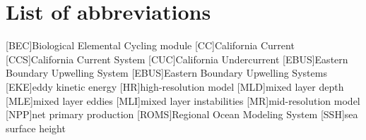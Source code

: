 \chapter*{List of abbreviations}
%
\begin{acronym}
[BEC]{Biological Elemental Cycling module}
[CC]{California Current}
[CCS]{California Current System}
[CUC]{California Undercurrent}
[EBUS]{Eastern Boundary Upwelling System}
[EBUS]{Eastern Boundary Upwelling Systems}
[EKE]{eddy kinetic energy}
[HR]{high-resolution model}
[MLD]{mixed layer depth}
[MLE]{mixed layer eddies}
[MLI]{mixed layer instabilities}
[MR]{mid-resolution model}
[NPP]{net primary production}
[ROMS]{Regional Ocean Modeling System}
[SSH]{sea surface height}
\end{acronym}